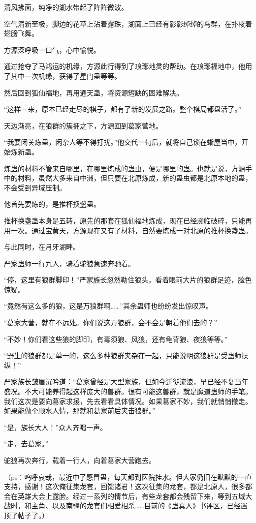 \begin{this_body}
清风拂面，纯净的湖水带起了阵阵微波。

空气清新至极，脚边的花草上沾着露珠，湖面上已经有影影绰绰的鸟群，在扑棱着翅膀飞舞。

方源深呼吸一口气，心中愉悦。

通过抢夺了马鸿运的机缘，方源此行得到了琅琊地灵的帮助。在琅琊福地中，他用了其中一次机缘，获得了星门蛊等等。

然后回到狐仙福地，再用通天蛊，将资源短缺的困难解决。

“这样一来，原本已经走尽的棋子，都有了新的发展之路。整个棋局都盘活了。”

天边渐亮，在狼群的簇拥之下，方源回到葛家营地。

“我要闭关炼蛊，闲杂人等不得打扰。”他交代一句后，就将自己锁在蜥屋当中，开始炼新蛊。

炼蛊的材料不管来自哪里，在哪里炼成的蛊虫，便是哪里的蛊。也就是说，方源手中的材料，虽然大多来自中洲，但只要在北原炼成，新的蛊虫都是北原本地的蛊，不会受到异域压制。

他首先要炼的，是推杯换盏蛊。

推杯换盏蛊本身是五转，原先的那套在狐仙福地炼成，现在已经濒临破碎，只能再用一次。通过宝黄天，方源现在又有了材料，自然要炼成一对北原的推杯换盏蛊。

与此同时，在月牙湖畔。

严家蛊师一行九人，骑着驼狼急速奔驰着。

“停，这里有狼群脚印！”严家族长忽然勒住狼头，看着眼前大片的狼群足迹，脸色惊疑。

“竟然有这么多的狼，这是万狼群啊……”其余蛊师也纷纷发出惊叹声。

“葛家大营，就在不远处。你们说这万狼群，会不会是朝着他们去的？”

“不妙！你们看这些狼的脚印，有毒须狼、风狼，还有龟背狼、夜狼等等。”

“野生的狼群都是单一的，这么多种狼群夹杂在一起，只能说明这狼群是受蛊师操纵！”

严家族长皱眉沉吟道：“葛家曾经是大型家族，但如今迁徙流浪，早已经不复当年盛况。不大可能养得起这样庞大的兽群。很有可能这兽群，就是魔道蛊师的手笔。我们这次是要向葛家求援，先去看看具体情况。如果葛家不妙，我们就悄悄撤走。如果能做个顺水人情，那就和葛家前后夹击狼群。”

“是，族长大人！”众人齐喝一声。

“走，去葛家。”

驼狼再次奔行，载着一行人，向着葛家大营跑去。

（ps：呜呼哀哉，最近中了感冒蛊，每天都到医院挂水。但大家仍旧在默默的一直支持，感谢！这次俺征集龙套，回馈诸君！这次征集的龙套，都是北原人，很多都会在英雄大会上露脸。经过一系列的情节后，有些龙套都会残留下来，等到五域大战时，和主角、以及南疆的龙套们相爱相杀……目前的《蛊真人》书评区，已经置顶了帖子了。）

\end{this_body}

